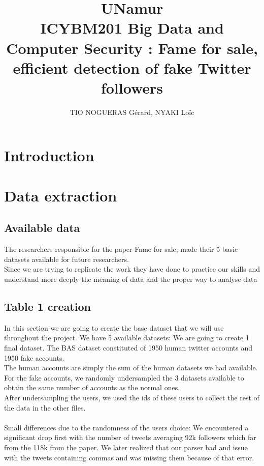 \documentclass[a4paper,11pt]{article}
\title{UNamur\\
	ICYBM201 Big Data and Computer Security : Fame for sale, efficient detection of fake Twitter
followers}
\author{TIO NOGUERAS Gérard, NYAKI Loïc}
\begin{document}
\maketitle

\newpage
\tableofcontents
\newpage

\section{Introduction}

\section{Data extraction}
\subsection{Available data}
The researchers responsible for the paper Fame for sale, made their 5 basic datasets available for future researchers.\\ Since we are trying to replicate the work they have done to practice our skills and understand more deeply the meaning of data and the proper way to analyse data
\subsection{Table 1 creation}
In this section we are going to create the base dataset that we will use throughout the project.
We have 5 available datasets: 
We are going to create 1 final dataset. The BAS dataset constituted of 1950 human twitter accounts and 1950 fake accounts.\\ The human accounts are simply the sum of the human datasets we had available.\\
For the fake accounts, we randomly undersampled the 3 datasets available to obtain the same number of accounts as the normal ones.\\
After undersampling the users, we used the ids of these users to collect the rest of the data in the other files.\\\\
Small differences due to the randomness of the users choice:
We encountered a significant drop first with the number of tweets averaging 92k followers which far from the 118k from the paper. We later realized that our parser had and issue with the tweets containing commas and was missing them because of that error.\\
\end{document}
